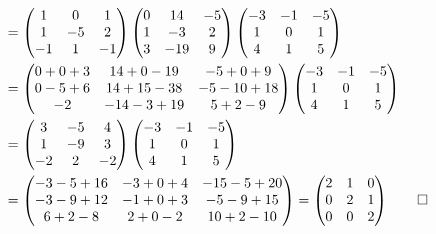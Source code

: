 \begin{loesung}
\begin{align*}
\\
&=
\begin{pmatrix}
   1&  0&  1\\
   1& -5&  2\\
  -1&  1& -1
\end{pmatrix}
\begin{pmatrix}
    0&  14&  -5\\
    1&  -3&   2\\
    3& -19&   9
\end{pmatrix}
\begin{pmatrix}
  -3& -1& -5\\
   1&  0&  1\\
   4&  1&  5
\end{pmatrix}
\\
&=
\begin{pmatrix}
   0+0+3&14+0-19& -5+0+9\\
   0-5+6&14+15-38&-5-10+18\\
-2&-14-3+19&5+2-9
\end{pmatrix}
\begin{pmatrix}
  -3& -1& -5\\
   1&  0&  1\\
   4&  1&  5
\end{pmatrix}
\\
&=
\begin{pmatrix}
   3& -5&  4\\
   1& -9&  3\\
  -2&  2& -2
\end{pmatrix}
\begin{pmatrix}
  -3& -1& -5\\
   1&  0&  1\\
   4&  1&  5
\end{pmatrix}
\\
&=
\begin{pmatrix}
-3-5+16&-3+0+4&-15-5+20\\
-3-9+12&-1+0+3&-5-9+15\\
6+2-8&2+0-2&10+2-10
\end{pmatrix}
=
\begin{pmatrix}
2&1&0\\
0&2&1\\
0&0&2
\end{pmatrix}
\qedhere
\end{align*}
\end{loesung}

